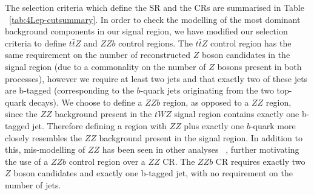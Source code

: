 The selection criteria which define the SR and the CRs are summarised in Table ~\ref{tab:4Lep-cutsummary}. In order to check the modelling of the most dominant background components in our signal region, we have modified our selection criteria to define $t\bar{t}Z$ and $ZZb$ control regions. The $t\bar{t}Z$ control region has the same requirement on the number of reconstructed $Z$ boson candidates in the signal region (due to a commonality on the number of $Z$ bosons present in both processes), however we require at least two jets and that exactly two of these jets are b-tagged (corresponding to the $b$-quark jets originating from the two top-quark decays). We choose to define a $ZZb$ region, as opposed to a $ZZ$ region, since the $ZZ$ background present in the $tWZ$ signal region contains exactly one b-tagged jet. Therefore defining a region with $ZZ$ plus exactly one $b$-quark more closely resembles the $ZZ$ background present in the signal region. In addition to this, mis-modelling of $ZZ$ has been seen in other analyses ~\cite{Aaboud:2019, ppToZZ:CMSpaper}, further motivating the use of a $ZZb$ control region over a $ZZ$ CR. The $ZZb$ CR requires exactly two $Z$ boson candidates and exactly one b-tagged jet, with no requirement on the number of jets.




